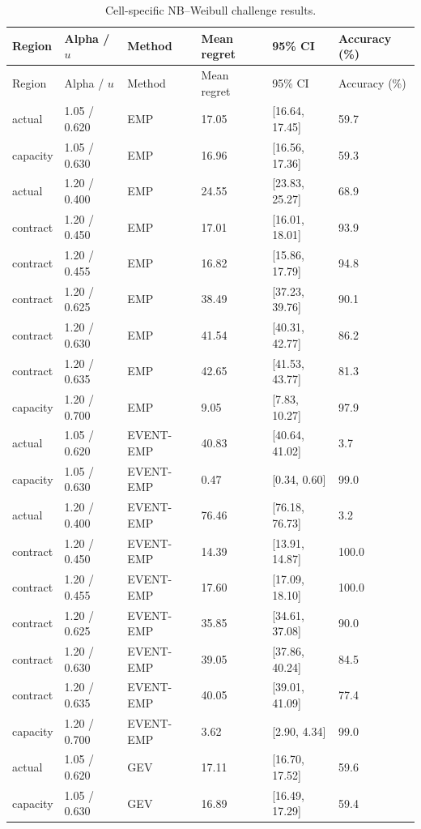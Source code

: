 \begingroup
\fontsize{8.5}{10.5}\selectfont\setlength{\tabcolsep}{3pt}
\begin{longtable}{@{}llllll@{}}
\caption{Cell-specific NB--Weibull challenge results.}\label{tab:final-si-4}\\
\toprule
Region & Alpha / $u$ & Method & Mean regret & 95\% CI & Accuracy (\%)\\\midrule\endfirsthead
Region & Alpha / $u$ & Method & Mean regret & 95\% CI & Accuracy (\%)\\\midrule\endhead
actual & 1.05 / 0.620 & EMP & 17.05 & [16.64, 17.45] & 59.7\\
capacity & 1.05 / 0.630 & EMP & 16.96 & [16.56, 17.36] & 59.3\\
actual & 1.20 / 0.400 & EMP & 24.55 & [23.83, 25.27] & 68.9\\
contract & 1.20 / 0.450 & EMP & 17.01 & [16.01, 18.01] & 93.9\\
contract & 1.20 / 0.455 & EMP & 16.82 & [15.86, 17.79] & 94.8\\
contract & 1.20 / 0.625 & EMP & 38.49 & [37.23, 39.76] & 90.1\\
contract & 1.20 / 0.630 & EMP & 41.54 & [40.31, 42.77] & 86.2\\
contract & 1.20 / 0.635 & EMP & 42.65 & [41.53, 43.77] & 81.3\\
capacity & 1.20 / 0.700 & EMP & 9.05 & [7.83, 10.27] & 97.9\\
actual & 1.05 / 0.620 & EVENT-EMP & 40.83 & [40.64, 41.02] & 3.7\\
capacity & 1.05 / 0.630 & EVENT-EMP & 0.47 & [0.34, 0.60] & 99.0\\
actual & 1.20 / 0.400 & EVENT-EMP & 76.46 & [76.18, 76.73] & 3.2\\
contract & 1.20 / 0.450 & EVENT-EMP & 14.39 & [13.91, 14.87] & 100.0\\
contract & 1.20 / 0.455 & EVENT-EMP & 17.60 & [17.09, 18.10] & 100.0\\
contract & 1.20 / 0.625 & EVENT-EMP & 35.85 & [34.61, 37.08] & 90.0\\
contract & 1.20 / 0.630 & EVENT-EMP & 39.05 & [37.86, 40.24] & 84.5\\
contract & 1.20 / 0.635 & EVENT-EMP & 40.05 & [39.01, 41.09] & 77.4\\
capacity & 1.20 / 0.700 & EVENT-EMP & 3.62 & [2.90, 4.34] & 99.0\\
actual & 1.05 / 0.620 & GEV & 17.11 & [16.70, 17.52] & 59.6\\
capacity & 1.05 / 0.630 & GEV & 16.89 & [16.49, 17.29] & 59.4\\

\end{longtable}
